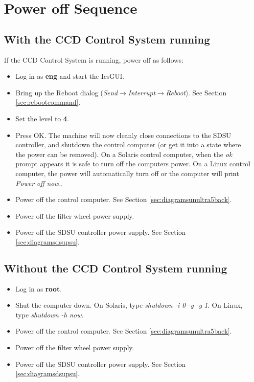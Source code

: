 \documentclass[10pt,a4paper]{article}
\begin{document}
\section{Power off Sequence}
\subsection{With the CCD Control System running}
If the CCD Control System is running, power off as follows:
\begin{itemize}
\item Log in as {\bf eng} and start the IcsGUI.
\item Bring up the Reboot dialog ({\em Send$\rightarrow$Interrupt$\rightarrow$Reboot}). 
	See Section \ref{sec:rebootcommand}.
\item Set the level to {\bf 4}.
\item Press OK. The machine will now cleanly close connections to the SDSU controller, and
	shutdown the control computer (or get it into a state where the power can be removed).
	On a Solaris control computer, when the {\em ok} prompt appears it is safe to turn off the computers power.
	On a Linux control computer, the power will automatically turn off or the computer will print
	{\em Power off now.}.
\item Power off the control computer. See Section \ref{sec:diagramsunultra5back}.
\item Power off the filter wheel power supply.
\item Power off the SDSU controller power supply. See Section \ref{sec:diagramsdsupsu}.
\end{itemize}

\subsection{Without the CCD Control System running}
\begin{itemize}
\item Log in as {\bf root}.
\item Shut the computer down. On Solaris, type {\em shutdown -i 0 -y -g 1}. On Linux, type {\em shutdown -h now}.
\item Power off the control computer. See Section \ref{sec:diagramsunultra5back}.
\item Power off the filter wheel power supply.
\item Power off the SDSU controller power supply. See Section \ref{sec:diagramsdsupsu}.
\end{itemize}
\end{document}
